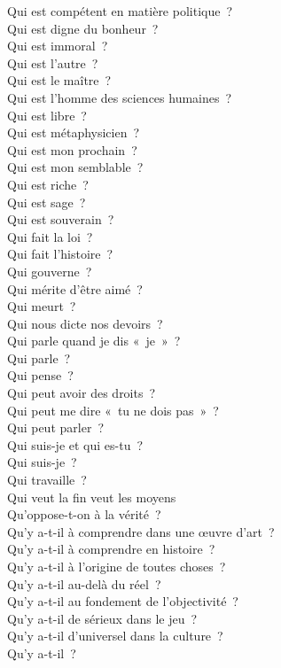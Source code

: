 \documentclass[a4paper,12pt]{article}
\begin{document}
Qui est compétent en matière politique ? \\
Qui est digne du bonheur ? \\
Qui est immoral ? \\
Qui est l'autre ? \\
Qui est le maître ? \\
Qui est l'homme des sciences humaines ? \\
Qui est libre ? \\
Qui est métaphysicien ? \\
Qui est mon prochain ? \\
Qui est mon semblable ? \\
Qui est riche ? \\
Qui est sage ? \\
Qui est souverain ? \\
Qui fait la loi ? \\
Qui fait l'histoire ? \\
Qui gouverne ? \\
Qui mérite d'être aimé ? \\
Qui meurt ? \\
Qui nous dicte nos devoirs ? \\
Qui parle quand je dis « je » ? \\
Qui parle ? \\
Qui pense ? \\
Qui peut avoir des droits ? \\
Qui peut me dire « tu ne dois pas » ? \\
Qui peut parler ? \\
Qui suis-je et qui es-tu ? \\
Qui suis-je ? \\
Qui travaille ? \\
Qui veut la fin veut les moyens \\
Qu'oppose-t-on à la vérité ? \\
Qu'y a-t-il à comprendre dans une œuvre d'art ? \\
Qu'y a-t-il à comprendre en histoire ? \\
Qu'y a-t-il à l'origine de toutes choses ? \\
Qu'y a-t-il au-delà du réel ? \\
Qu'y a-t-il au fondement de l'objectivité ? \\
Qu'y a-t-il de sérieux dans le jeu ? \\
Qu'y a-t-il d'universel dans la culture ? \\
Qu'y a-t-il ? \\
\end{document}
